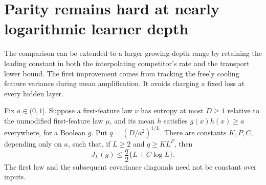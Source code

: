 \section{Parity remains hard at nearly logarithmic learner depth}
\label{sec:critical-nearly-logarithmic-depth}

The comparison can be extended to a larger growing-depth range by
retaining the leading constant in both the interpolating competitor's
rate and the transport lower bound. The first improvement comes from
tracking the freely cooling feature variance during mean amplification.
It avoids charging a fixed loss at every hidden layer.

\begin{lemma}
\label{lem:critical-sharp-mean-amplification}
Fix $a\in(0,1]$. Suppose a first-feature law $\nu$ has entropy at most
$D\ge1$ relative to the unmodified first-feature law $\mu$, and its
mean $h$ satisfies $g(x)h(x)\ge a$ everywhere, for a Boolean $g$.
Put $q=(D/a^2)^{1/L}$. There are constants $K,P,C$, depending only on
$a$, such that, if $L\ge2$ and $q\ge KL^P$, then
\[
 J_L(g)\le\frac q2\{L+C\log L\}.
\]
The first law and the subsequent covariance diagonals need not be
constant over inputs.
\end{lemma}

